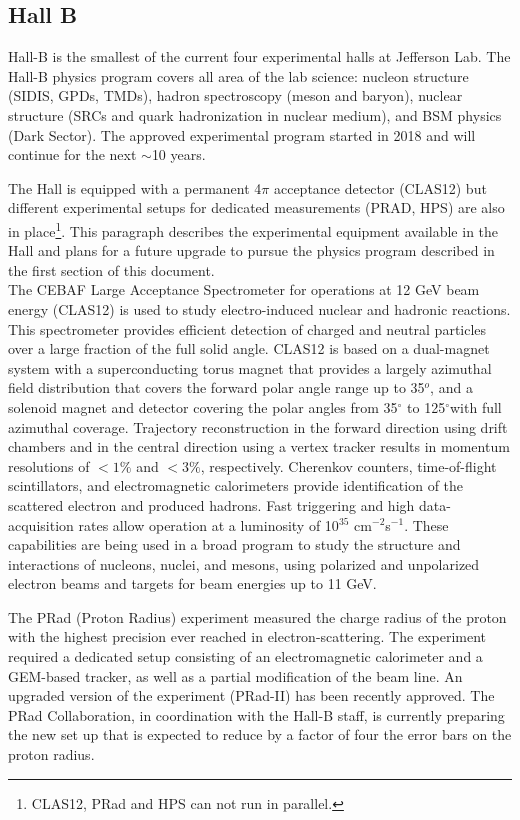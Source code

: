 \subsection{Hall B		}
\label{sec:app-hallb}

Hall-B is the smallest of the current four experimental halls at Jefferson Lab. The Hall-B physics program covers all area of the lab science: nucleon structure (SIDIS, GPDs, TMDs), hadron spectroscopy (meson and baryon), nuclear structure (SRCs and quark hadronization in nuclear medium), and BSM physics (Dark Sector). The approved experimental program started in 2018 and will continue for the next $\sim$10 years.

The Hall is equipped with a permanent 4$\pi$ acceptance detector (CLAS12) but different experimental setups for dedicated measurements (PRAD, HPS) are also in place\footnote{CLAS12, PRad and HPS can not run in parallel.}. This paragraph describes the experimental equipment available in the Hall and plans for a future upgrade to pursue the physics program described in the first section of this document.\\ 

The CEBAF Large Acceptance Spectrometer for operations at 12 GeV beam energy (CLAS12) is used to study electro-induced nuclear and hadronic reactions. This spectrometer provides efficient detection of charged and neutral particles over a large fraction of the full solid angle. CLAS12
is based on a dual-magnet system with a superconducting torus magnet that provides a largely azimuthal
field distribution that covers the forward polar angle range up to 35$^o$, and a solenoid magnet and detector covering the polar angles from 35$^\circ$ to 125$^\circ$with full azimuthal coverage. Trajectory reconstruction in the
forward direction using drift chambers and in the central direction using a vertex tracker results in momentum
resolutions of $<1\%$ and $<3\%$, respectively. Cherenkov counters, time-of-flight scintillators, and
electromagnetic calorimeters provide identification of the scattered electron and produced hadrons. Fast triggering and high data-acquisition
rates allow operation at a luminosity of 10$^{35}$ cm$^{-2}$s$^{-1}$. These capabilities are being used in a broad program
to study the structure and interactions of nucleons, nuclei, and mesons, using polarized and unpolarized
electron beams and targets for beam energies up to 11 GeV.

The PRad (Proton Radius) experiment measured the charge radius of the proton with the highest precision ever reached in electron-scattering. The experiment required a dedicated setup consisting of an electromagnetic calorimeter and a GEM-based tracker, as well as a partial modification of the beam line. An upgraded version of the experiment (PRad-II) has been recently approved. The PRad Collaboration, in coordination with the Hall-B staff, is currently preparing the new set up that is expected to reduce by a factor of four the error bars on the proton radius.

